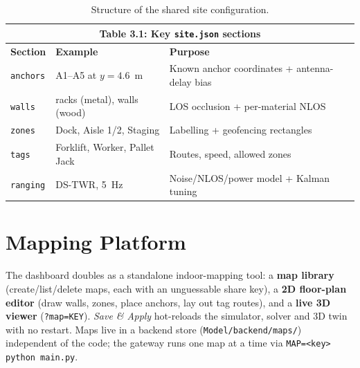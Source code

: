 \documentclass[a4paper,12pt,onecolumn]{report}
\begin{document}
\begin{table}[H]
\begin{center}
\begin{tabular}{ | l | l | p{7.5cm} | }
\hline
\multicolumn{3}{|c|}{\textbf{Table 3.1: Key \texttt{site.json} sections}}\\
\hline
\textbf{Section} & \textbf{Example} & \textbf{Purpose}\\ \hline
\texttt{anchors} & A1--A5 at $y=4.6$~m & Known anchor coordinates + antenna-delay bias \\ \hline
\texttt{walls}   & racks (metal), walls (wood) & LOS occlusion + per-material NLOS \\ \hline
\texttt{zones}   & Dock, Aisle 1/2, Staging & Labelling + geofencing rectangles \\ \hline
\texttt{tags}    & Forklift, Worker, Pallet Jack & Routes, speed, allowed zones \\ \hline
\texttt{ranging} & DS-TWR, 5~Hz & Noise/NLOS/power model + Kalman tuning \\
\hline
\end{tabular}
\caption{Structure of the shared site configuration.}
\label{tab:site}
\end{center}
\end{table}

\section{Mapping Platform}
The dashboard doubles as a standalone indoor-mapping tool: a \textbf{map library}
(create/list/delete maps, each with an unguessable share key), a \textbf{2D
floor-plan editor} (draw walls, zones, place anchors, lay out tag routes), and a
\textbf{live 3D viewer} (\texttt{?map=KEY}). \emph{Save \& Apply} hot-reloads the
simulator, solver and 3D twin with no restart. Maps live in a backend store
(\texttt{Model/backend/maps/}) independent of the code; the gateway runs one map
at a time via \texttt{MAP=<key> python main.py}.
\end{document}
